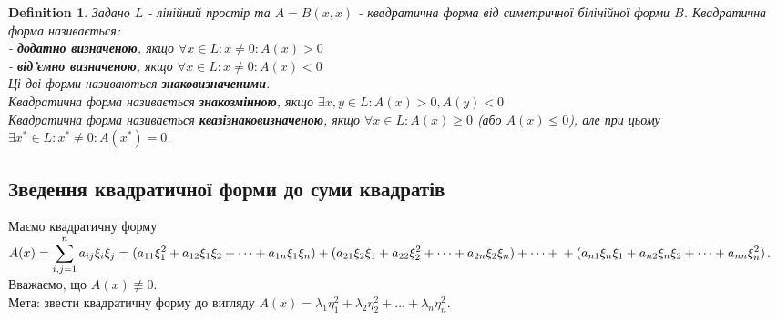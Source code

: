 \documentclass[a4paper, 10pt]{article}
\theoremstyle{theoremdd}
\newtheorem{definition}[theorem]{Definition}
\begin{document}
\begin{definition}
Задано $L$ - лінійний простір та $A = B(x,x)$ - квадратична форма від симетричної білінійної форми $B$. Квадратична форма називається:\\
- \textbf{додатно визначеною}, якщо $\forall x \in L: x \neq 0: A(x) > 0$\\
- \textbf{від'ємно визначеною}, якщо $\forall x \in L: x \neq 0: A(x) < 0$\\
Ці дві форми називаються \textbf{знаковизначеними}.
\bigskip \\
Квадратична форма називається \textbf{знакозмінною}, якщо $\exists x,y \in L: A(x) >0, A(y) < 0$\\
Квадратична форма називається \textbf{квазізнаковизначеною}, якщо $\forall x \in L: A(x) \geq 0$ (або $A(x) \leq 0$), але при цьому $\exists x^* \in L: x^* \neq 0: A(x^*) = 0$.
\end{definition}

\subsection{Зведення квадратичної форми до суми квадратів}
Маємо квадратичну форму \\ $A(x) = \displaystyle\sum_{i,j=1}^n a_{ij} \xi_i \xi_j = (a_{11}\xi_1^2 + a_{12}\xi_1\xi_2 + \dots + a_{1n}\xi_1 \xi_n) + (a_{21}\xi_2\xi_1 + a_{22}\xi_2^2 + \dots + a_{2n}\xi_2 \xi_n) + \dots + \\ +
(a_{n1}\xi_n \xi_1 + a_{n2}\xi_n\xi_2 + \dots + a_{nn}\xi_n^2)$. Вважаємо, що $A(x) \not\equiv 0$. \\
Мета: звести квадратичну форму до вигляду $A(x) = \lambda_1 \eta_1^2 + \lambda_2 \eta_2^2 + \dots + \lambda_n \eta_n^2$.
\end{document}
